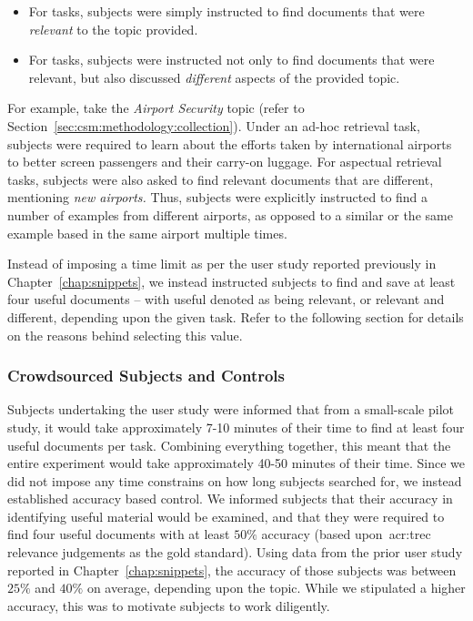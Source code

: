 \begin{itemize}
    \item{For  tasks, subjects were simply instructed to find documents that were \emph{relevant} to the topic provided.}
    \item{For  tasks, subjects were instructed not only to find documents that were relevant, but also discussed \emph{different} aspects of the provided topic.}
\end{itemize}

For example, take the \emph{Airport Security} topic (refer to Section~\ref{sec:csm:methodology:collection}). Under an ad-hoc retrieval task, subjects were required to learn about the efforts taken by international airports to better screen passengers and their carry-on luggage. For aspectual retrieval tasks, subjects were also asked to find relevant documents that are different, mentioning \emph{new airports.} Thus, subjects were explicitly instructed to find a number of examples from different airports, as opposed to a similar or the same example based in the same airport multiple times.

Instead of imposing a time limit as per the user study reported previously in Chapter~\ref{chap:snippets}, we instead instructed subjects to find and save at least four useful documents -- with useful denoted as being relevant, or relevant and different, depending upon the given task. Refer to the following section for details on the reasons behind selecting this value.

\subsubsection{Crowdsourced Subjects and Controls}
Subjects undertaking the user study were informed that from a small-scale pilot study, it would take approximately 7-10 minutes of their time to find at least four useful documents per task. Combining everything together, this meant that the entire experiment would take approximately 40-50 minutes of their time. Since we did not impose any time constrains on how long subjects searched for, we instead established accuracy based control. We informed subjects that their accuracy in identifying useful material would be examined, and that they were required to find four useful documents with at least $50\%$ accuracy (based upon~\gls{acr:trec} relevance judgements as the gold standard). Using data from the prior user study reported in Chapter~\ref{chap:snippets}, the accuracy of those subjects was between $25\%$ and $40\%$ on average, depending upon the topic. While we stipulated a higher accuracy, this was to motivate subjects to work diligently.

